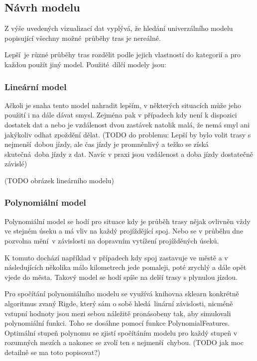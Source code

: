 \subsection{Návrh modelu}

Z výše uvedených vizualizací dat vyplývá, že hledání univerzálního modelu popisující všechny možné průběhy tras je nereálné.

\bigbreak

Lepší je různé průběhy tras rozdělit podle jejich vlastností do kategorií a pro každou použít jiný model. Použité dílčí modely jsou:


\subsubsection{Lineární model}

Ačkoli je snaha tento model nahradit lepším, v některých situacích může jeho použití i na dále dávat smysl. Zejména pak v případech kdy není k dispozici dostatek dat a nebo je vzdálenost dvou zastávek natolik malá, že nemá smyl ani jakýkoliv odhat zpoždění dělat. (TODO do problemu: Lepší by bylo volit trasy s nejmenší dobou jízdy, ale čas jízdy je promněnlivý a težko se získá skutečná doba jízdy z dat. Navíc v praxi jsou vzdálenost a doba jízdy dostatečně závislé)

(TODO obrázek lineárního modelu)


\subsubsection{Polynomiální model}

Polynomiální model se hodí pro situace kdy je průběh trasy nějak ovlivněn vždy ve stejném úseku a má vliv na každý projíždějící spoj. Nebo se v průběhu dne pozvolna mění v závislosti na dopravním vytížení projížděných úseků.

\bigbreak

K tomuto dochází například v případech kdy spoj zastavuje ve městě a v následujících několika málo kilometrech jede pomaleji, poté zrychlý a dále opět vjede do města. Takový model se hodí spíše na delší trasy s plynulou jízdou.

\bigbreak

Pro spočítání polynomiálního modelu se využívá knihovna sklearn konkrétně algoritmus zvaný Rigde, který sám o sobě hledá linární závislosti, nicméně vstupní hodnoty jsou mezi sebou náležitě pronásobeny tak, aby simulovali polynomiální funkci. Toho se dosáhne pomocí funkce PolynomialFeatures. Optimální stupeň polynomu se zjistí spočítáním modelu pro každý stupeň v rozumných mezích a nakonec se zvolí ten s nejmenší chybou. (TODO jak moc detailně se ma toto popisovat?)

